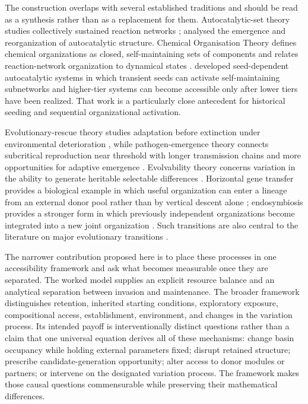 \documentclass[11pt,a4paper]{article}
\begin{document}
The construction overlaps with several established traditions and should be read as a synthesis rather than as a replacement for them. Autocatalytic-set theory studies collectively sustained reaction networks \citep{Hordijk2010,Hordijk2012}; \citet{Jain1998,Jain2001} analysed the emergence and reorganization of autocatalytic structure. Chemical Organisation Theory defines chemical organizations as closed, self-maintaining sets of components and relates reaction-network organization to dynamical states \citep{Dittrich2007}. \citet{Peng2022} developed seed-dependent autocatalytic systems in which transient seeds can activate self-maintaining subnetworks and higher-tier systems can become accessible only after lower tiers have been realized. That work is a particularly close antecedent for historical seeding and sequential organizational activation.

Evolutionary-rescue theory studies adaptation before extinction under environmental deterioration \citep{Bell2017,Ferriere2013}, while pathogen-emergence theory connects subcritical reproduction near threshold with longer transmission chains and more opportunities for adaptive emergence \citep{Antia2003,Woolhouse2005}. Evolvability theory concerns variation in the ability to generate heritable selectable differences \citep{WagnerAltenberg1996,Gerhart2007}. Horizontal gene transfer provides a biological example in which useful organization can enter a lineage from an external donor pool rather than by vertical descent alone \citep{Soucy2015}; endosymbiosis provides a stronger form in which previously independent organizations become integrated into a new joint organization \citep{Archibald2015}. Such transitions are also central to the literature on major evolutionary transitions \citep{SzathmarySmith1995}.

The narrower contribution proposed here is to place these processes in one accessibility framework and ask what becomes measurable once they are separated. The worked model supplies an explicit resource balance and an analytical separation between invasion and maintenance. The broader framework distinguishes retention, inherited starting conditions, exploratory exposure, compositional access, establishment, environment, and changes in the variation process. Its intended payoff is interventionally distinct questions rather than a claim that one universal equation derives all of these mechanisms: change basin occupancy while holding external parameters fixed; disrupt retained structure; prescribe candidate-generation opportunity; alter access to donor modules or partners; or intervene on the designated variation process. The framework makes those causal questions commensurable while preserving their mathematical differences.
\end{document}
